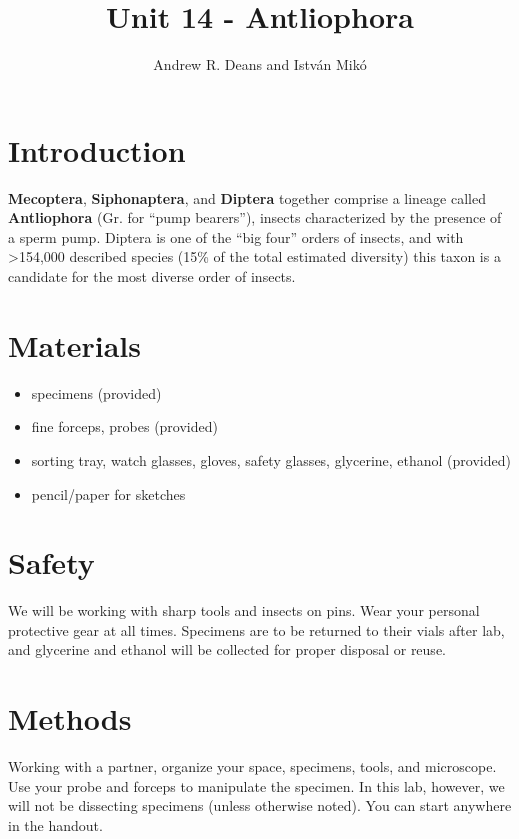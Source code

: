 \documentclass[letterpaper, 11pt]{article}
\title{Unit 14 - Antliophora}%
\author{Andrew R. Deans and Istv\'an Mik\'o}
\begin{document}
\cleanlookdateon %
\maketitle
\thispagestyle{fancy}
\section*{Introduction}
\textbf{Mecoptera}, \textbf{Siphonaptera}, and \textbf{Diptera} together comprise a lineage called \textbf{Antliophora} (Gr. for ``pump bearers''), insects characterized by the presence of a sperm pump. Diptera is one of the ``big four'' orders of insects, and with \textgreater154,000 described species (15\% of the total estimated diversity) this taxon is a candidate for the most diverse order of insects. 

\section*{Materials}
\begin{itemize}
\item specimens (provided)
\item fine forceps, probes (provided)
\item sorting tray, watch glasses, gloves, safety glasses, glycerine, ethanol (provided)
\item pencil/paper for sketches
\end{itemize}

\section*{Safety}
We will be working with sharp tools and insects on pins. Wear your personal protective gear at all times. Specimens are to be returned to their vials after lab, and glycerine and ethanol will be collected for proper disposal or reuse.

\section*{Methods}
Working with a partner, organize your space, specimens, tools, and microscope. Use your probe and forceps to manipulate the specimen. In this lab, however, we will not be dissecting specimens (unless otherwise noted). You can start anywhere in the handout.
\end{document}
